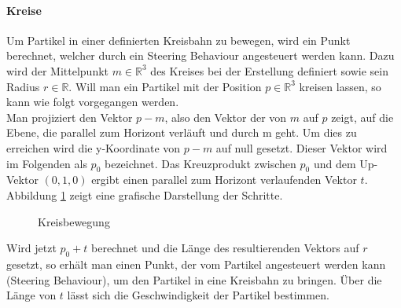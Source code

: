 \documentclass[11pt,a4paper]{article}
\begin{document}
\paragraph{Kreise}
Um Partikel in einer definierten Kreisbahn zu bewegen, wird ein Punkt berechnet, welcher durch ein Steering Behaviour angesteuert werden kann.
Dazu wird der Mittelpunkt $m \in \mathbb{R}^3$ des Kreises bei der Erstellung definiert sowie sein Radius $r \in \mathbb{R}$. Will man ein Partikel mit der Position $p \in \mathbb{R}^3$ kreisen lassen, so kann wie folgt vorgegangen werden.\\
Man projiziert den Vektor $p - m$, also den Vektor der von $m$ auf $p$ zeigt, auf die Ebene, die parallel zum Horizont verläuft und durch m geht. Um dies zu erreichen wird die y-Koordinate von $p - m$ auf null gesetzt. Dieser Vektor wird im Folgenden als $p_0$ bezeichnet. Das Kreuzprodukt zwischen $p_0$ und dem Up-Vektor $(0, 1, 0)$ ergibt einen parallel zum Horizont verlaufenden Vektor $t$. Abbildung \ref{fig:kreisberechnung} zeigt eine grafische Darstellung der Schritte.
\begin{center}
\begin{figure}[!ht]
\centering
\vspace{20pt}
\caption[Kreisbewegung]{Kreisbewegung}
\label{fig:kreisberechnung}
\end{figure}
\end{center}
\noindent
Wird jetzt $p_0+t$ berechnet und die Länge des resultierenden Vektors auf $r$ gesetzt, so erhält man einen Punkt, der vom Partikel angesteuert werden kann (Steering Behaviour), um den Partikel in eine Kreisbahn zu bringen. Über die Länge von $t$ lässt sich die Geschwindigkeit der Partikel bestimmen.
\end{document}
